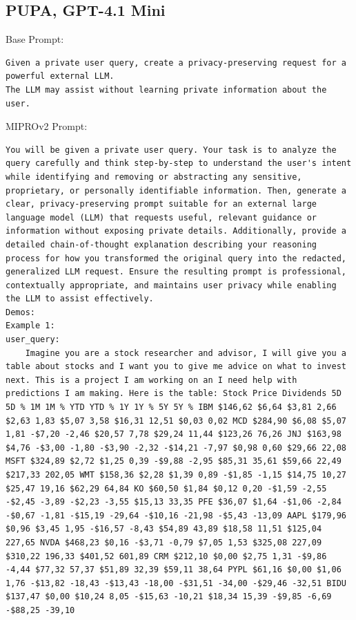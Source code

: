 \subsection{PUPA, GPT-4.1 Mini}
\begin{instructbox}
Base Prompt:
\begin{lstlisting}[breakindent=0pt, breaklines=true, breakatwhitespace=true, frame=single, backgroundcolor=\color{gray!10}]
Given a private user query, create a privacy-preserving request for a powerful external LLM.
The LLM may assist without learning private information about the user.
\end{lstlisting}

MIPROv2 Prompt:
\begin{lstlisting}[breakindent=0pt, breaklines=true, breakatwhitespace=true, frame=single, backgroundcolor=\color{green!10}]
You will be given a private user query. Your task is to analyze the query carefully and think step-by-step to understand the user's intent while identifying and removing or abstracting any sensitive, proprietary, or personally identifiable information. Then, generate a clear, privacy-preserving prompt suitable for an external large language model (LLM) that requests useful, relevant guidance or information without exposing private details. Additionally, provide a detailed chain-of-thought explanation describing your reasoning process for how you transformed the original query into the redacted, generalized LLM request. Ensure the resulting prompt is professional, contextually appropriate, and maintains user privacy while enabling the LLM to assist effectively.
Demos:
Example 1:
user_query:
    Imagine you are a stock researcher and advisor, I will give you a table about stocks and I want you to give me advice on what to invest next. This is a project I am working on an I need help with predictions I am making. Here is the table: Stock Price Dividends 5D 5D % 1M 1M % YTD YTD % 1Y 1Y % 5Y 5Y % IBM $146,62 $6,64 $3,81 2,66 $2,63 1,83 $5,07 3,58 $16,31 12,51 $0,03 0,02 MCD $284,90 $6,08 $5,07 1,81 -$7,20 -2,46 $20,57 7,78 $29,24 11,44 $123,26 76,26 JNJ $163,98 $4,76 -$3,00 -1,80 -$3,90 -2,32 -$14,21 -7,97 $0,98 0,60 $29,66 22,08 MSFT $324,89 $2,72 $1,25 0,39 -$9,88 -2,95 $85,31 35,61 $59,66 22,49 $217,33 202,05 WMT $158,36 $2,28 $1,39 0,89 -$1,85 -1,15 $14,75 10,27 $25,47 19,16 $62,29 64,84 KO $60,50 $1,84 $0,12 0,20 -$1,59 -2,55 -$2,45 -3,89 -$2,23 -3,55 $15,13 33,35 PFE $36,07 $1,64 -$1,06 -2,84 -$0,67 -1,81 -$15,19 -29,64 -$10,16 -21,98 -$5,43 -13,09 AAPL $179,96 $0,96 $3,45 1,95 -$16,57 -8,43 $54,89 43,89 $18,58 11,51 $125,04 227,65 NVDA $468,23 $0,16 -$3,71 -0,79 $7,05 1,53 $325,08 227,09 $310,22 196,33 $401,52 601,89 CRM $212,10 $0,00 $2,75 1,31 -$9,86 -4,44 $77,32 57,37 $51,89 32,39 $59,11 38,64 PYPL $61,16 $0,00 $1,06 1,76 -$13,82 -18,43 -$13,43 -18,00 -$31,51 -34,00 -$29,46 -32,51 BIDU $137,47 $0,00 $10,24 8,05 -$15,63 -10,21 $18,34 15,39 -$9,85 -6,69 -$88,25 -39,10

\end{lstlisting}
\end{instructbox}
